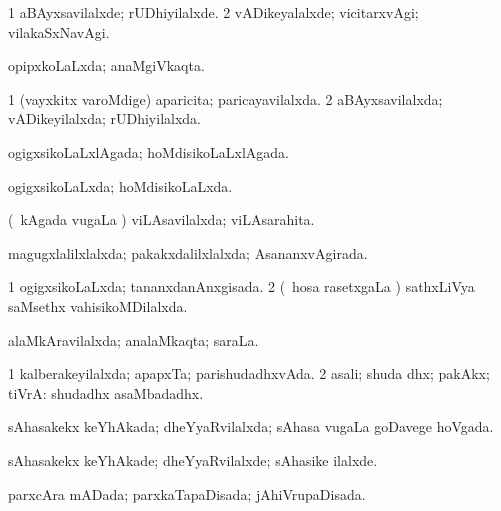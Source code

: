 \bentry
{} 
\gl{\kirxvi}
\expl{}
\bmng
\bnum
\num{1} aBAyxsavilalxde; rUDhiyilalxde. 
\num{2} vADikeyalalxde; vicitarxvAgi; vilakaSxNavAgi. 
\enum
\emng
\eentry

\bentry
{} 
\gl{\gu}
\expl{}
\bmng
opipxkoLaLxda; anaMgiVkaqta. 
\emng
\eentry

\bentry
{} 
\gl{\gu}
\expl{}
\bmng
\bnum
\num{1} (vayxkitx \mo varoMdige) aparicita; paricayavilalxda. 
\num{2} aBAyxsavilalxda; vADikeyilalxda; rUDhiyilalxda. 
\enum
\emng
\eentry

\bentry
{} 
\gl{\gu}
\expl{}
\bmng
ogigxsikoLaLxlAgada; hoMdisikoLaLxlAgada. 
\emng
\eentry

\bentry
{} 
\gl{\gu}
\expl{}
\bmng
ogigxsikoLaLxda; hoMdisikoLaLxda. 
\emng
\eentry

\bentry
{} 
\gl{\gu}
\expl{}
\bmng
(\kanmu\ kAgada \mo vugaLa \vi) viLAsavilalxda; viLAsarahita. 
\emng
\eentry

\bentry
{} 
\gl{\gu}
\expl{}
\bmng
magugxlalilxlalxda; pakakxdalilxlalxda; AsananxvAgirada. 
\emng
\eentry

\bentry
{} 
\gl{\gu}
\expl{}
\bmng
\bnum
\num{1} ogigxsikoLaLxda; tananxdanAnxgisada. 
\num{2} (\kanmu\ hosa rasetxgaLa \vi) sathxLiVya saMsethx vahisikoMDilalxda. 
\enum
\emng
\eentry

\bentry
{} 
\gl{\gu}
\expl{}
\bmng
alaMkAravilalxda; analaMkaqta; saraLa. 
\emng
\eentry

\bentry
{} 
\gl{\gu}
\expl{}
\bmng
\bnum
\num{1} kalberakeyilalxda; apapxTa; parishudadhxvAda. 
\num{2} asali; shuda dhx; pakAkx; tiVrA:  shudadhx asaMbadadhx. 
\enum
\emng
\eentry

\bentry
{} 
\gl{\gu}
\expl{}
\bmng
sAhasakekx keYhAkada; dheYyaRvilalxda; sAhasa \mo vugaLa goDavege hoVgada. 
\emng
\eentry

\bentry
{} 
\gl{\kirxvi}
\expl{}
\bmng
sAhasakekx keYhAkade; dheYyaRvilalxde; sAhasike ilalxde. 
\emng
\eentry

\bentry
{} 
\gl{\gu}
\expl{}
\bmng
parxcAra mADada; parxkaTapaDisada; jAhiVrupaDisada. 
\emng
\eentry

